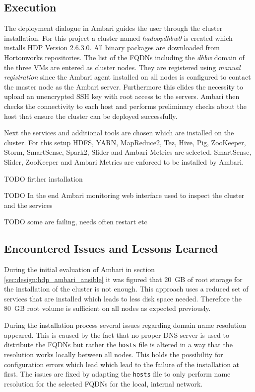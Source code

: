 \subsection{Execution}

The deployment dialogue in Ambari guides the user through the cluster installation.
For this project a cluster named \emph{hadoopdhbw0} is created which installs \ac{HDP} Version 2.6.3.0. All binary packages are downloaded from Hortonworks repositories.
The list of the \acp{FQDN} including the \emph{dhbw} domain of the three \acp{VM} are entered as cluster nodes. They are registered using \emph{manual registration} since the Ambari agent installed on all nodes is configured to contact the master node as the Ambari server. Furthermore this elides the necessity to upload an unencrypted \ac{SSH} key with root access to the servers.
Ambari then checks the connectivity to each host and performs preliminary checks about the host that ensure the cluster can be deployed successfully.

Next the services and additional tools are chosen which are installed on the cluster.
For this setup \ac{HDFS}, \ac{YARN}, MapReduce2, Tez, Hive, Pig, ZooKeeper, Storm, SmartSense, Spark2, Slider and Ambari Metrics are selected. SmartSense, Slider, ZooKeeper and Ambari Metrics are enforced to be installed by Ambari.


TODO firther installation


TODO In the end Ambari monitoring web interface used to inspect the cluster and the services

TODO some are failing, needs often restart etc

\subsection{Encountered Issues and Lessons Learned}

During the initial evaluation of Ambari in section \vref{sec:design:hdp_ambari_ansible} it was figured that 20~\ac{GB} of root storage for the installation of the cluster is not enough. This approach uses a reduced set of services that are installed which leads to less disk space needed. Therefore the 80~\ac{GB} root volume is sufficient on all nodes as expected previously.

During the installation process several issues regarding domain name resolution appeared.
This is caused by the fact that no proper \ac{DNS} server is used to distribute the \acp{FQDN} 
but rather the \texttt{hosts} file is altered in a way that the resolution works locally between all nodes. 
This holds the possibility for configuration errors which lead which lead to the failure of the installation at first.
The issues are fixed by adapting the \texttt{hosts} file to only perform name resolution for the selected \acp{FQDN} for the local, internal network. 

